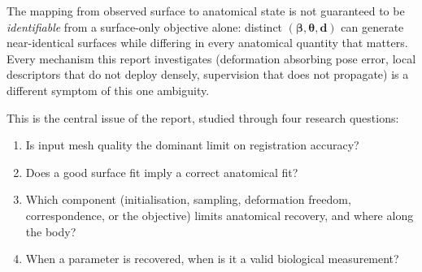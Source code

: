 \begin{tcolorbox}[invstyle,title={Formal problem statement}]
The mapping from observed surface to anatomical state is not guaranteed to
be \emph{identifiable} from a surface-only objective alone: distinct
$(\bm\beta,\bm\theta,\mathbf d)$ can generate near-identical surfaces while
differing in every anatomical quantity that matters. Every mechanism this
report investigates (deformation absorbing pose error, local descriptors
that do not deploy densely, supervision that does not propagate) is a
different symptom of this one ambiguity.
\end{tcolorbox}

This is the central issue of the report, studied through four research
questions:

\begin{enumerate}[nosep,label=\textbf{RQ\arabic*.}]
\item Is input mesh quality the dominant limit on registration accuracy?
\item Does a good surface fit imply a correct anatomical fit?
\item Which component (initialisation, sampling, deformation freedom,
correspondence, or the objective) limits anatomical recovery, and where
along the body?
\item When a parameter is recovered, when is it a valid biological
measurement?
\end{enumerate}

